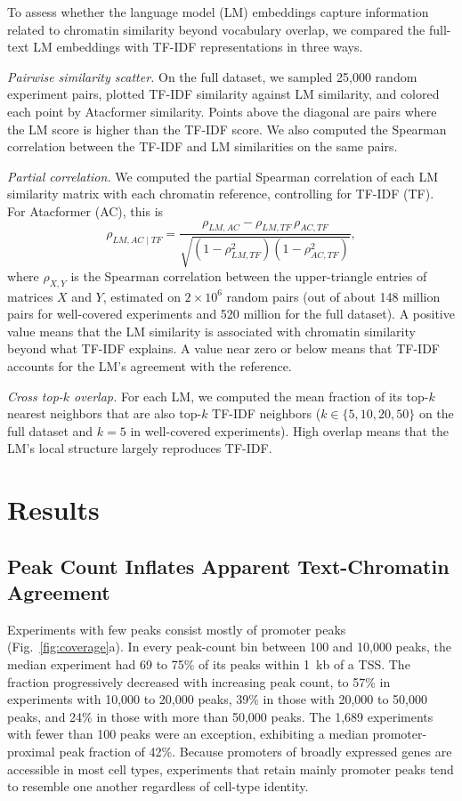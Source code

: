 \documentclass[12pt]{article}
\begin{document}
To assess whether the language model (LM) embeddings capture information
related to chromatin similarity beyond vocabulary overlap, we compared the
full-text LM embeddings with TF-IDF representations in three ways.

\textit{Pairwise similarity scatter.} On the full dataset, we sampled 25,000
random experiment pairs, plotted TF-IDF similarity against LM similarity, and
colored each point by Atacformer similarity. Points above the diagonal are
pairs where the LM score is higher than the TF-IDF score. We also computed the
Spearman correlation between the TF-IDF and LM similarities on the same pairs.

\textit{Partial correlation.} We computed the partial Spearman correlation of
each LM similarity matrix with each chromatin reference, controlling for
TF-IDF (TF). For Atacformer (AC), this is
\begin{equation}
  \rho_{LM,AC \mid TF} =
    \frac{\rho_{LM,AC} - \rho_{LM,TF}\,\rho_{AC,TF}}
         {\sqrt{(1-\rho_{LM,TF}^{2})(1-\rho_{AC,TF}^{2})}},
\end{equation}
where $\rho_{X,Y}$ is the Spearman correlation between the upper-triangle
entries of matrices $X$ and $Y$, estimated on $2 \times 10^6$ random pairs
(out of about 148 million pairs for well-covered experiments and 520 million
for the full dataset). A positive value means that the LM similarity is
associated with chromatin similarity beyond what TF-IDF explains. A value near
zero or below means that TF-IDF accounts for the LM's agreement with the
reference.

\textit{Cross top-$k$ overlap.} For each LM, we computed the mean fraction of
its top-$k$ nearest neighbors that are also top-$k$ TF-IDF neighbors
($k \in \{5, 10, 20, 50\}$ on the full dataset and $k = 5$ in well-covered
experiments). High overlap means that the LM's local structure largely
reproduces TF-IDF.

\section{Results}

\subsection{Peak Count Inflates Apparent Text-Chromatin Agreement}
\label{sec:coverage}

Experiments with few peaks consist mostly of promoter peaks
(Fig.~\ref{fig:coverage}a). In every peak-count bin between 100 and 10,000
peaks, the median experiment had 69 to 75\% of its peaks within 1~kb of a TSS.
The fraction progressively decreased with increasing peak count, to 57\% in
experiments with 10,000 to 20,000 peaks, 39\% in those with 20,000 to 50,000
peaks, and 24\% in those with more than 50,000 peaks. The 1,689 experiments
with fewer than 100 peaks were an exception, exhibiting a median
promoter-proximal peak fraction of 42\%. Because promoters of broadly
expressed genes are accessible in most cell types, experiments that retain
mainly promoter peaks tend to resemble one another regardless of cell-type
identity.
\end{document}
